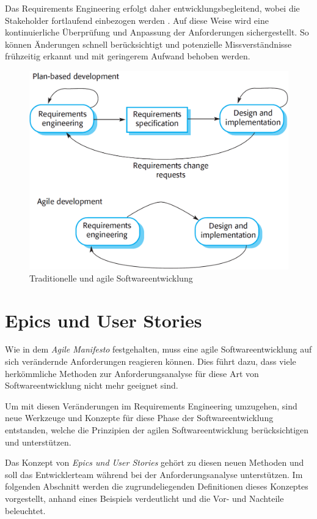 \documentclass[acmtog]{acmart}
\begin{document}
Das Requirements Engineering erfolgt daher entwicklungsbegleitend, wobei die Stakeholder fortlaufend einbezogen werden \cite{sommerville16}. Auf diese Weise wird eine kontinuierliche Überprüfung und Anpassung der Anforderungen sichergestellt.
So können Änderungen schnell berücksichtigt und potenzielle Missverständnisse frühzeitig erkannt und mit geringerem Aufwand behoben werden.

\begin{figure}[t]
	\centering
	\includegraphics[width=\linewidth]{images/plandriven-and-agil-development.png}
	\caption{Traditionelle und agile Softwareentwicklung \cite{sommerville16}}
	\label{fig:development}
	\Description{}
\end{figure}

\section{Epics und User Stories}
Wie in dem \emph{Agile Manifesto} \cite{beedle_principles_2001} festgehalten, muss eine agile Softwareentwicklung
auf sich verändernde Anforderungen reagieren können.
Dies führt dazu, dass viele herkömmliche Methoden zur Anforderungsanalyse für diese Art von Softwareentwicklung
nicht mehr geeignet sind.

Um mit diesen Veränderungen im Requirements Engineering umzugehen, sind neue Werkzeuge und Konzepte
für diese Phase der Softwareentwicklung entstanden, welche die Prinzipien der agilen Softwareentwicklung
berücksichtigen und unterstützen.

Das Konzept von \emph{Epics und User Stories} gehört zu diesen neuen Methoden und soll das Entwicklerteam
während bei der Anforderungsanalyse unterstützen. Im folgenden Abschnitt werden die zugrundeliegenden Definitionen
dieses Konzeptes vorgestellt, anhand eines Beispiels verdeutlicht und die Vor- und Nachteile beleuchtet.
\end{document}

